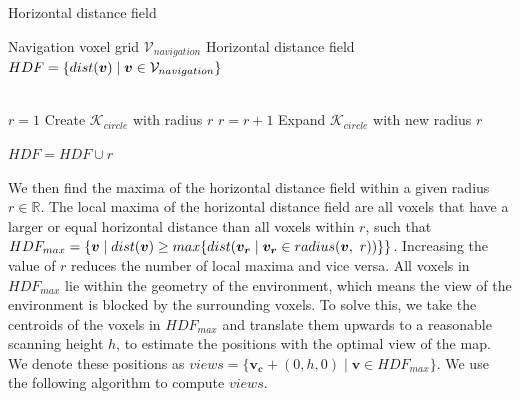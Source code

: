 \begin{algorithm}
    \caption{Horizontal distance field}
    \begin{algorithmic}

    \Require \quad Navigation voxel grid \(\mathcal{V}_{navigation}\)
    \Ensure \quad Horizontal distance field \(HDF = \{dist(\boldsymbol{v}) \mid \boldsymbol{v} \in \mathcal{V}_{navigation}\}\)

    \\

        \State \(r=1\)
        \State Create \(\mathcal{K}_{circle}\) with radius \(r\)
            \State \(r = r+1\)
            \State Expand \(\mathcal{K}_{circle}\) with new radius \(r\)
        \EndWhile

        \State \(HDF = HDF \cup {r}\) 
    \EndFor
    \end{algorithmic}
\end{algorithm}

We then find the maxima of the horizontal distance field within a given radius \(r \in \mathbb{R}\).  The local maxima of the horizontal distance field are all voxels that have a larger or equal horizontal distance than all voxels within \(r\), such that \(HDF_{max} = \{\boldsymbol{v} \mid dist(\boldsymbol{v}) \geq max \{dist(\boldsymbol{v_{r}} \mid \boldsymbol{v_{r}} \in radius(\boldsymbol{v},\ r))\}\}\). Increasing the value of \(r\) reduces the number of local maxima and vice versa. All voxels in \(HDF_{max}\) lie within the geometry of the environment, which means the view of the environment is blocked by the surrounding voxels. To solve this, we take the centroids of the voxels in \(HDF_{max}\) and translate them upwards to a reasonable scanning height \(h\), to estimate the positions with the optimal view of the map. We denote these positions as \(views = \{\boldsymbol{v_c} + (0, h, 0) \mid \boldsymbol{v} \in HDF_{max}\}\). We use the following algorithm to compute \(views\).

